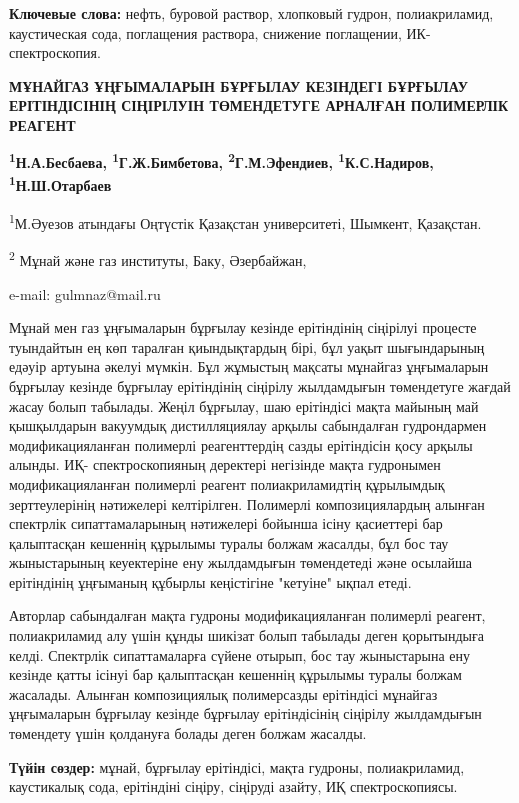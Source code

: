{\bfseries Ключевые слова:} нефть, буровой раствор, хлопковый гудрон,
полиакриламид, каустическая сода, поглащения раствора, снижение
поглащении, ИК-спектроскопия.

\begin{center}
{\large\bfseries МҰНАЙГАЗ ҰҢҒЫМАЛАРЫН БҰРҒЫЛАУ КЕЗІНДЕГІ БҰРҒЫЛАУ ЕРІТІНДІСІНІҢ
СІҢІРІЛУІН ТӨМЕНДЕТУГЕ АРНАЛҒАН ПОЛИМЕРЛІК РЕАГЕНТ}

{\bfseries \textsuperscript{1}Н.А.Бесбаева, \textsuperscript{1}Г.Ж.Бимбетова\envelope, \textsuperscript{2}Г.М.Эфендиев, \textsuperscript{1}К.С.Надиров, \textsuperscript{1}Н.Ш.Отарбаев}

\textsuperscript{1}М.Әуезов атындағы Оңтүстік Қазақстан университеті,
Шымкент, Қазақстан.

\textsuperscript{2} Мұнай және газ институты, Баку, Әзербайжан,

e-mail: gulmnaz@mail.ru
\end{center}

Мұнай мен газ ұңғымаларын бұрғылау кезінде ерітіндінің сіңірілуі
процесте туындайтын ең көп таралған қиындықтардың бірі, бұл уақыт
шығындарының едәуір артуына әкелуі мүмкін. Бұл жұмыстың мақсаты мұнайгаз
ұңғымаларын бұрғылау кезінде бұрғылау ерітіндінің сіңірілу жылдамдығын
төмендетуге жағдай жасау болып табылады. Жеңіл бұрғылау, шаю ерітіндісі
мақта майының май қышқылдарын вакуумдық дистилляциялау арқылы
сабындалған гудрондармен модификацияланған полимерлі реагенттердің сазды
ерітіндісін қосу арқылы алынды. ИҚ- спектроскопияның деректері негізінде
мақта гудронымен модификацияланған полимерлі реагент полиакриламидтің
құрылымдық зерттеулерінің нәтижелері келтірілген. Полимерлі
композициялардың алынған спектрлік сипаттамаларының нәтижелері бойынша
ісіну қасиеттері бар қалыптасқан кешеннің құрылымы туралы болжам
жасалды, бұл бос тау жыныстарының кеуектеріне ену жылдамдығын
төмендетеді және осылайша ерітіндінің ұңғыманың құбырлы кеңістігіне
"кетуіне" ықпал етеді.

Авторлар сабындалған мақта гудроны модификацияланған полимерлі реагент,
полиакриламид алу үшін құнды шикізат болып табылады деген қорытындыға
келді. Спектрлік сипаттамаларға сүйене отырып, бос тау жыныстарына ену
кезінде қатты ісінуі бар қалыптасқан кешеннің құрылымы туралы болжам
жасалады. Алынған композициялық полимерсазды ерітіндісі мұнайгаз
ұңғымаларын бұрғылау кезінде бұрғылау ерітіндісінің сіңірілу жылдамдығын
төмендету үшін қолдануға болады деген болжам жасалды.

{\bfseries Түйін сөздер:} мұнай, бұрғылау ерітіндісі, мақта гудроны,
полиакриламид, каустикалық сода, ерітіндіні сіңіру, сіңіруді азайту, ИҚ
спектроскопиясы.

